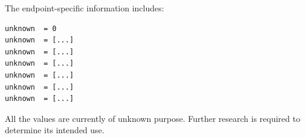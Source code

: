 The endpoint-specific information includes:

\begin{lstlisting}
unknown  = 0
unknown  = [...]
unknown  = [...]
unknown  = [...]
unknown  = [...]
unknown  = [...]
unknown  = [...]
\end{lstlisting}

\begin{tcolorbox}[colback=yellow!10,colframe=orange!80!black,title=Warning]
All the values are currently of unknown purpose.
Further research is required to determine its intended use.
\end{tcolorbox}

\newpage